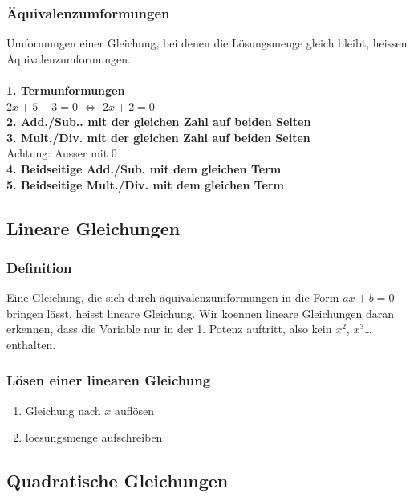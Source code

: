 \begin{multicols}{2}
    \subsubsection{Äquivalenzumformungen}
    \vspace{-4mm}
    Umformungen einer Gleichung, bei denen die Lösungsmenge gleich bleibt, heissen Äquivalenzumformungen.\\~\\
    \textbf{1. Termunformungen}\\
    $2x+5-3=0$ $\Longleftrightarrow$ $2x +2 = 0$ \\
    \textbf{2. Add./Sub.. mit der gleichen Zahl auf beiden Seiten} \\
    \textbf{3. Mult./Div. mit der gleichen Zahl auf beiden Seiten} \\
    Achtung: Ausser mit 0 \\
    \textbf{4. Beidseitige Add./Sub. mit dem gleichen Term} \\
    \textbf{5. Beidseitige Mult./Div. mit dem gleichen Term}

    \subsection{Lineare Gleichungen}
    \vspace{-4mm}
    \subsubsection{Definition}
    \vspace{-4mm}
    Eine Gleichung, die sich durch äquivalenzumformungen in die Form $ax + b = 0$ bringen lässt, heisst lineare Gleichung. Wir koennen lineare Gleichungen daran erkennen, dass die Variable nur in der 1. Potenz auftritt, also kein $x^2$, $x^3$\dots enthalten.

    \subsubsection{Lösen einer linearen Gleichung}
    \begin{enumerate}
        \item Gleichung nach $x$ auflösen
        \item loesungsmenge aufschreiben
    \end{enumerate}

    \subsection{Quadratische Gleichungen}
    \vspace{-4mm}

\end{multicols}
